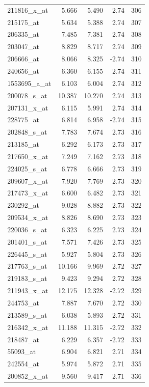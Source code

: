\begin{footnotesize}
\begin{longtable}{lrrrr}
211816\_x\_at & 5.666 & 5.490 & 2.74 & 306 \\
215175\_at & 5.634 & 5.388 & 2.74 & 307 \\
206335\_at & 7.485 & 7.381 & 2.74 & 308 \\
203047\_at & 8.829 & 8.717 & 2.74 & 309 \\
206666\_at & 8.066 & 8.325 & -2.74 & 310 \\
240656\_at & 6.360 & 6.155 & 2.74 & 311 \\
1553695\_a\_at & 6.103 & 6.004 & 2.74 & 312 \\
200078\_s\_at & 10.387 & 10.270 & 2.74 & 313 \\
207131\_x\_at & 6.115 & 5.991 & 2.74 & 314 \\
228775\_at & 6.814 & 6.958 & -2.74 & 315 \\
202848\_s\_at & 7.783 & 7.674 & 2.73 & 316 \\
213185\_at & 6.292 & 6.173 & 2.73 & 317 \\
217650\_x\_at & 7.249 & 7.162 & 2.73 & 318 \\
224025\_s\_at & 6.778 & 6.666 & 2.73 & 319 \\
209607\_x\_at & 7.920 & 7.769 & 2.73 & 320 \\
217473\_x\_at & 6.600 & 6.482 & 2.73 & 321 \\
230292\_at & 9.028 & 8.882 & 2.73 & 322 \\
209534\_x\_at & 8.826 & 8.690 & 2.73 & 323 \\
220036\_s\_at & 6.323 & 6.225 & 2.73 & 324 \\
201401\_s\_at & 7.571 & 7.426 & 2.73 & 325 \\
226445\_s\_at & 5.927 & 5.804 & 2.73 & 326 \\
217763\_s\_at & 10.166 & 9.969 & 2.72 & 327 \\
219183\_s\_at & 9.423 & 9.294 & 2.72 & 328 \\
211943\_x\_at & 12.175 & 12.328 & -2.72 & 329 \\
244753\_at & 7.887 & 7.670 & 2.72 & 330 \\
213589\_s\_at & 6.038 & 5.893 & 2.72 & 331 \\
216342\_x\_at & 11.188 & 11.315 & -2.72 & 332 \\
218487\_at & 6.229 & 6.357 & -2.72 & 333 \\
55093\_at & 6.904 & 6.821 & 2.71 & 334 \\
242554\_at & 5.974 & 5.872 & 2.71 & 335 \\
200852\_x\_at & 9.560 & 9.417 & 2.71 & 336 \\

\end{longtable}
\end{footnotesize}
